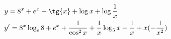 \begin{ex}
\begin{align}
&y=8^x+e^x+\tg{x}+\log{x}+\log{\frac{1}{x}}\nonumber\\
&y'=8^x\log_{e}{8}+e^x+\frac{1}{\cos^2{x}}+\frac{1}{x}\log_{5}{x}+\frac{1}{x}+x(-\frac{1}{x^2})\nonumber
\end{align}
\end{ex}